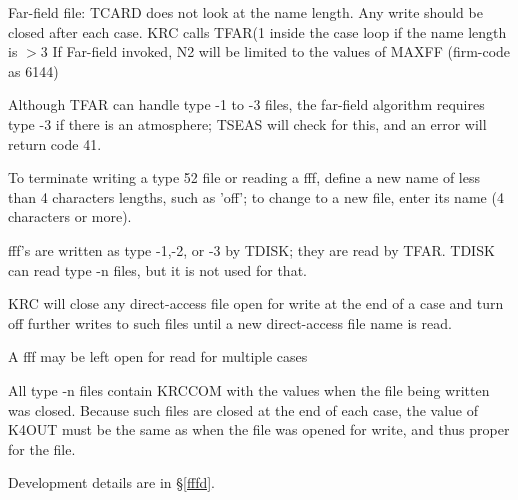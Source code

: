  Far-field file: TCARD does not look at the name length. Any write should be closed after each case.
\qi  KRC calls TFAR(1  inside the case loop if the name length is $>3$
\qi  If Far-field invoked, N2 will be limited to the values of MAXFF (firm-code as 6144)

Although TFAR can handle type -1 to -3 files, the far-field algorithm requires
type -3 if there is an atmosphere; TSEAS will check for this, and an error will
return code 41.

To terminate writing a type 52 file or reading a fff, define a new name of less
than 4 characters lengths, such as 'off'; to change to a new file, enter its
name (4 characters or more).

fff's are written as type -1,-2, or -3 by TDISK; they are read by
TFAR. TDISK can read type -n files, but it is not used for that.

KRC will close any direct-access file open for write at the end of a case
and turn off further writes to such files until a new direct-access file name is
read.

A fff may be left open for read for multiple cases

All type -n files contain KRCCOM with the values when the file being written was
closed. Because such files are closed at the end of each case, the value of
K4OUT must be the same as when the file was opened for write, and thus proper
for the file.

Development details are in \S \ref{fffd}.


